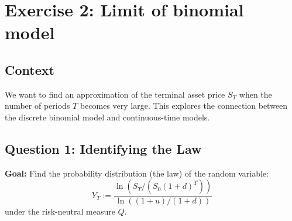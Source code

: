 \section*{Exercise 2: Limit of binomial model}

\subsection*{Context}
We want to find an approximation of the terminal asset price $S_T$ when the number of periods $T$ becomes very large. This explores the connection between the discrete binomial model and continuous-time models.

\subsection*{Question 1: Identifying the Law}
\textbf{Goal:} Find the probability distribution (the law) of the random variable:
\begin{equation*}
    Y_T := \frac{\ln(S_T / (S_0(1+d)^T))}{\ln((1+u)/(1+d))}
\end{equation*}
under the risk-neutral measure $Q$.

